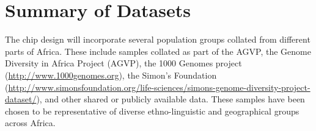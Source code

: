 \section{Summary of Datasets}
The chip design will incorporate several population groups collated from different parts of Africa. These include samples collated as part of the AGVP, the Genome Diversity in Africa Project (AGVP), the 1000 Genomes project (\href{http://www.1000genomes.org}{http://www.1000genomes.org}), the Simon’s Foundation (\href{http://www.simonsfoundation.org/life-sciences/simons-genome-diversity-project-dataset/}{http://www.simonsfoundation.org/life-sciences/simons-genome-diversity-project-dataset/}), and other shared or publicly available data. These samples have been chosen to be representative of diverse ethno-linguistic and geographical groups across Africa.

